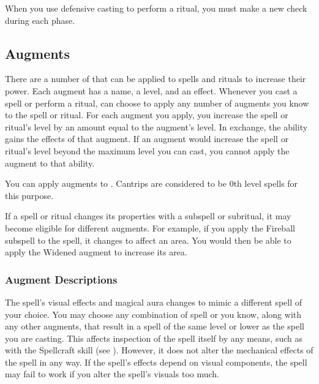             When you use defensive casting to perform a ritual, you must make a new check during each phase.

    \subsection{Augments}\label{Augments}
        There are a number of  that can be applied to spells and rituals to increase their power.
        Each augment has a name, a level, and an effect.
        Whenever you cast a spell or perform a ritual, can choose to apply any number of augments you know to the spell or ritual.
        For each augment you apply, you increase the spell or ritual's level by an amount equal to the augment's level.
        In exchange, the ability gains the effects of that augment.
        If an augment would increase the spell or ritual's level beyond the maximum level you can cast, you cannot apply the augment to that ability.

        You can apply augments to .
        Cantrips are considered to be 0th level spells for this purpose.

        If a spell or ritual changes its properties with a subspell or subritual, it may become eligible for different augments.
        For example, if you apply the Fireball subspell to the  spell, it changes to affect an area.
        You would then be able to apply the Widened augment to increase its area.

        \subsubsection{Augment Descriptions}\label{Augment Descriptions}

             The spell's visual effects and magical aura changes to mimic a different spell of your choice.
            You may choose any combination of spell or  you know, along with any other augments, that result in a spell of the same level or lower as the spell you are casting.
            This affects inspection of the spell itself by any means, such as with the Spellcraft skill (see ).
            However, it does not alter the mechanical effects of the spell in any way.
            If the spell's effects depend on visual components, the spell may fail to work if you alter the spell's visuals too much. 

